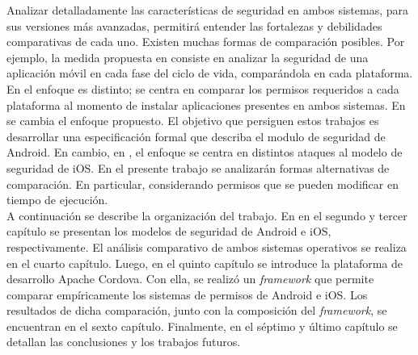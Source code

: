 Analizar detalladamente las características de seguridad en ambos sistemas, para sus versiones más avanzadas, permitirá entender las fortalezas y debilidades comparativas de cada uno. Existen muchas formas de comparación posibles. Por ejemplo, la medida propuesta en \cite{YA2014} consiste en analizar la seguridad de una aplicación móvil en cada fase del ciclo de vida, comparándola en cada plataforma. En \cite{HYGZD2014} el enfoque es distinto; se centra en comparar los permisos requeridos a cada plataforma al momento de instalar aplicaciones presentes en ambos sistemas. En \cite{Gor16, BCLR15, Rom14} se cambia el enfoque propuesto. El objetivo que persiguen estos trabajos es desarrollar una especificación formal que describa el modulo de seguridad de Android. En cambio, en \cite{TZSH13}, el enfoque se centra en distintos ataques al modelo de seguridad de iOS. En el presente trabajo se analizarán formas alternativas de comparación. En particular, considerando permisos que se pueden modificar en tiempo de ejecución.\\

A continuación se describe la organización del trabajo. En en el segundo y tercer capítulo se presentan los modelos de seguridad de Android e iOS, respectivamente. El análisis comparativo de ambos sistemas operativos se realiza en el cuarto capítulo. Luego, en el quinto capítulo se introduce la plataforma de desarrollo Apache Cordova. Con ella, se realizó un \emph{framework} que permite comparar empíricamente los sistemas de permisos de Android e iOS. Los resultados de dicha comparación, junto con la composición del \emph{framework}, se encuentran en el sexto capítulo. Finalmente, en el séptimo y último capítulo se detallan las conclusiones y los trabajos futuros.